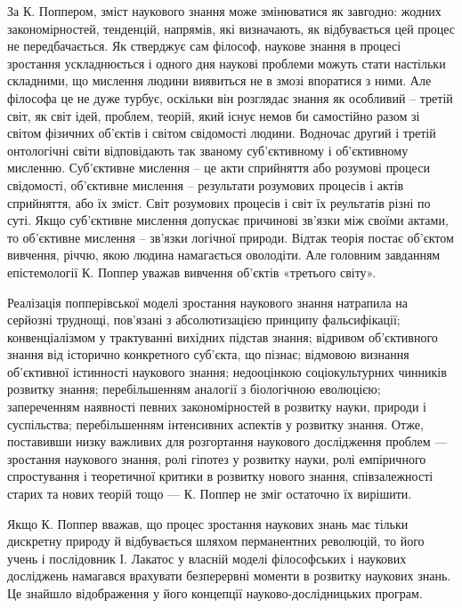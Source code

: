 За К. Поппером, зміст наукового знання може змінюватися як завгодно:
жодних закономірностей, тенденцій, напрямів, які визначають, як відбувається
цей процес не передбачається. Як стверджує сам філософ, наукове знання в
процесі зростання ускладнюється і одного дня наукові проблеми можуть стати
настільки складними, що мислення людини виявиться не в змозі впоратися з
ними. Але філософа це не дуже турбує, оскільки він розглядає знання як
особливий – третій світ, як світ ідей, проблем, теорій, який існує немов би
самостійно разом зі світом фізичних об’єктів і світом свідомості людини.
Водночас другий і третій онтологічні світи відповідають так званому
суб’єктивному і об’єктивному мисленню. Суб’єктивне мислення – це акти
сприйняття або розумові процеси свідомості, об’єктивне мислення – результати
розумових процесів і актів сприйняття, або їх зміст. Світ розумових процесів і
світ їх реультатів різні по суті. Якщо суб’єктивне мислення допускає причинові
зв’язки між своїми актами, то об’єктивне мислення – зв’язки логічної природи.
Відтак теорія постає об’єктом вивчення, річчю, якою людина намагається
оволодіти. Але головним завданням епістемології К. Поппер уважав вивчення
об’єктів «третього світу».

Реалізація попперівської моделі зростання наукового знання натрапила на
серйозні труднощі, пов’язані з абсолютизацією принципу фальсифікації;
конвенціалізмом у трактуванні вихідних підстав знання; відривом об’єктивного
знання від історично конкретного суб’єкта, що пізнає; відмовою визнання
об’єктивної істинності наукового знання; недооцінкою соціокультурних
чинників розвитку знання; перебільшенням аналогії з біологічною еволюцією;
запереченням наявності певних закономірностей в розвитку науки, природи і
суспільства; перебільшенням інтенсивних аспектів у розвитку знання. Отже,
поставивши низку важливих для розгортання наукового дослідження проблем ---
зростання наукового знання, ролі гіпотез у розвитку науки, ролі емпіричного
спростування і теоретичної критики в розвитку нового знання, співзалежності
старих та нових теорій тощо --- К. Поппер не зміг остаточно їх вирішити.

Якщо К. Поппер вважав, що процес зростання наукових знань має тільки
дискретну природу й відбувається шляхом перманентних революцій, то його
учень і послідовник І. Лакатос у власній моделі філософських і наукових
досліджень намагався врахувати безперервні моменти в розвитку наукових
знань. Це знайшло відображення у його концепції науково-дослідницьких
програм.

